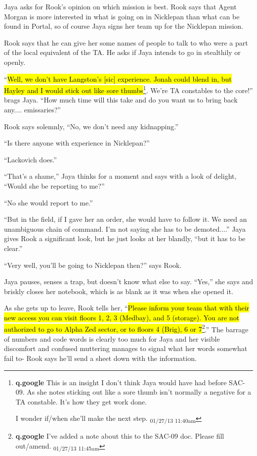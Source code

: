Jaya asks for Rook's opinion on which mission is best.  Rook says that Agent Morgan is more interested in what is going on in Nicklepan than what can be found in Portal, so of course Jaya signs her team up for the Nicklepan mission.



Rook says that he can give her some names of people to talk to who were a part of the local equivalent of the TA.  He asks if Jaya intends to go in stealthily or openly.  



``\hl{Well, we don't have Langston's {[}sic{]} experience.  Jonah could blend in, but Hayley and I would stick out like sore thumbs}\footnote{\textbf{q.google }This is an insight I don't think Jaya would have had before SAC-09.  As she notes sticking out like a sore thumb isn't normally a negative for a TA constable.  It's how they get work done.

I wonder if/when she'll make the next step. \textsubscript{01/27/13 11:40am}}.  We're TA constables to the core!''  brags Jaya.  ``How much time will this take and do you want us to bring back any.... emissaries?''

Rook says solemnly, ``No, we don't need any kidnapping.''

``Is there anyone with experience in Nicklepan?''

``Lackovich does.''

``That's a shame,'' Jaya thinks for a moment and says with a look of delight, ``Would she be reporting to me?''

``No she would report to me.''

``But in the field, if I gave her an order, she would have to follow it.  We need an unambiguous chain of command.  I'm not saying she has to be demoted....'' Jaya gives Rook a significant look, but he just looks at her blandly, ``but it has to be clear.''

``Very well, you'll be going to Nicklepan then?'' says Rook.



Jaya pauses, senses a trap, but doesn't know what else to say.  ``Yes,'' she says and briskly closes her notebook, which is as blank as it was when she opened it.



As she gets up to leave, Rook tells her, ``\hl{Please inform your team that with their new access you can visit floors 1, 2, 3 (Medbay), and 5 (storage).  You are not authorized to go to Alpha Zed sector, or to floors 4 (Brig), 6 or 7}\footnote{\textbf{q.google }I've added a note about this to the SAC-09 doc.  Please fill out/amend. \textsubscript{01/27/13 11:45am}}.''  The barrage of numbers and code words is clearly too much for Jaya and her visible discomfort and confused muttering manages to signal what her words somewhat fail to- Rook says he'll send a sheet down with the information.  


